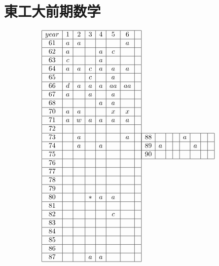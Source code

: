 \documentclass[a4j]{jarticle}
\begin{document}
\section{東工大前期数学}
     \begin{align*}
          \begin{array}{|c|c|c|c|c|c|c|c|} \hline
          year&1&2&3&4&5&6& \\ \hline
          61&a&a&&&&a& \\ \hline
          62&a&&&a&c&& \\ \hline
          63&c&&&a&&& \\ \hline
          64&a&a&c&a&a&a& \\ \hline
          65&&&c&&a&& \\ \hline
          66&d&a&a&a&aa&aa& \\ \hline
          67&a&&a&&a&& \\ \hline
          68&&&&a&a&& \\ \hline
          70&a&a&&&x&x& \\ \hline
          71&a&w&a&a&a&a& \\ \hline
          72&&&&&&& \\ \hline
          73&&a&&&&a& \\ \hline
          74&&a&&a&&& \\ \hline
          75&&&&&&& \\ \hline
          76&&&&&&& \\ \hline
          77&&&&&&& \\ \hline
          78&&&&&&& \\ \hline
          79&&&&&&& \\ \hline
          80&&&*&a&a&& \\ \hline
          81&&&&&&& \\ \hline
          82&&&&&c&& \\ \hline
          83&&&&&&& \\ \hline
          84&&&&&&& \\ \hline
          85&&&&&&& \\ \hline
          86&&&&&&& \\ \hline
          87&&&a&a&&& \\ \hline
          \end{array}
          \begin{array}{|c|c|c|c|c|c|c|c|} \hline
          88&&&&a&&& \\ \hline
          89&a&&&&a&& \\ \hline
          90&&&&&&& \\ \hline

\end{array}
\end{align*}
\end{document}
